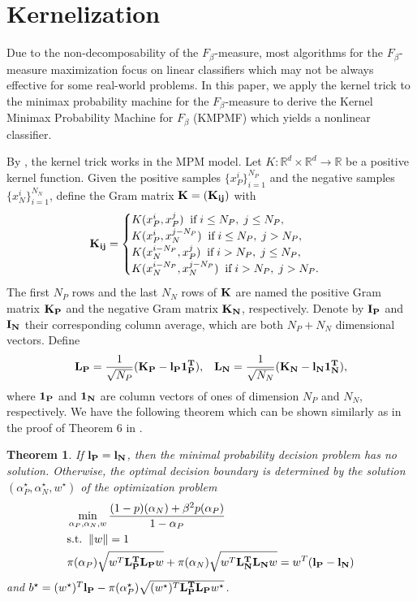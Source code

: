 \documentclass[15pt]{article}
\newcommand{\R}{{\mathbb R}}
\newcommand{\ben}{\begin{eqnarray*}}
\newcommand{\enn}{\end{eqnarray*}}
\newtheorem{theorem}{Theorem}
\begin{document}
\section{Kernelization}\label{sec5}


Due to the non-decomposability of the $F_\beta$-measure, most algorithms for the $F_\beta$-measure maximization 
focus on linear classifiers which may not be always effective for some real-world problems.
In this paper, we apply the kernel trick to the minimax probability machine for the $F_\beta$-measure
to derive the Kernel Minimax Probability Machine for $F_\beta$ (KMPMF) which yields a nonlinear classifier. 

By \cite{Lanckriet2002}, the kernel trick works in the MPM model.
Let $K:\R^d\times\R^d\to\R$ be a positive kernel function.
Given the positive samples $\{x_P^i\}_{i=1}^{N_P}$ and the negative samples $\{x_N^i\}_{i=1}^{N_N}$,
define the Gram matrix $\bf{K}=(\bf{K}_{ij})$ with
\begin{align*}
\bf{K}_{ij} =
\begin{cases}
K(x_P^i,x_P^j)\;\;\text{if}\; i\le N_P,\;j\le N_P,\\
K(x_P^i,x_N^{j-N_P})\;\;\text{if}\; i\le N_P,\;j>N_P,\\
K(x_N^{i-N_P},x_P^j)\;\; \text{if}\; i>N_P,\;j\le N_P,\\
K(x_N^{i-N_P},x_N^{j-N_P})\;\;\text{if}\; i>N_P,\;j>N_P.\\
\end{cases}
\end{align*}
The first $N_P$ rows and the last $N_N$ rows of $\bf K$ are named the positive Gram matrix $\bf K_P$ and
the negative Gram matrix $\bf K_N$, respectively.
Denote by $\bf I_P$ and $\bf I_N$ their corresponding column average, which are both $N_P+N_N$
dimensional vectors. Define
\ben
{\bf L_P}=\frac{1}{\sqrt{N_P}}({\bf K_P-l_P1_{P}^T}),\;\;\;
{\bf L_N }=\frac{1}{\sqrt{N_N}}(\bf{K_N-l_N1_{N}^T}),
\enn
where $\bf 1_{P}$ and $\bf 1_{N}$ are column vectors of ones of dimension $N_P$ and $N_N$, respectively.
We have the following theorem which can be shown similarly as in the proof of Theorem 6 in \cite{Lanckriet2002}.

\begin{theorem}\label{thm2}
If $\bf l_P=\bf l_N$, then the minimal probability decision problem has no solution. Otherwise, 
the optimal decision boundary is determined by the solution $(\alpha_P^\star,\alpha_N^\star,w^\star)$
of the optimization problem
\begin{align*}
\begin{split}
&\min_{\alpha_P,\alpha_N,w}\frac{(1-p)(\alpha_N)+\beta^2p(\alpha_P)}{1-\alpha_P}\\
&\text{s.t.}\;\;\|w\|=1\\
&\pi(\alpha_P)\sqrt{w^T{\bf L_P^T L_P}w}+\pi(\alpha_N)\sqrt{w^T{\bf L_N^T L_N}w}=w^T({\bf l_P-l_N})
\end{split}
\end{align*}
and $b^\star=(w^\star)^T{\bf l_P}-\pi(\alpha_P^\star)\sqrt{(w^\star)^T{\bf L_P^T L_P}w^\star}$.
\end{theorem}
\end{document}
